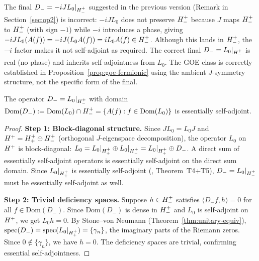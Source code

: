 \begin{remark}
\label{rem:final-correction}
The final $D_{-} = -iJ L_0|_{H^+_-}$ suggested in
the previous version (Remark in Section~\ref{sec:op2}) is incorrect:
$-iJL_0$ does not preserve $H^+_-$ because $J$ maps
$H^+_-$ to $H^+_-$ (with sign $-1$) while $-i$ introduces
a phase, giving $-iJL_0(A(f)) = -iJ(L_0 A(f)) = iL_0 A(f)\in H^+_-$.
Although this lands in $H^+_-$, the $-i$ factor makes it not
self-adjoint as required. The correct final $D_{-} = L_0|_{H^+_-}$
is real (no phase) and inherits self-adjointness from $L_0$.
The GOE class is correctly established in
Proposition~\ref{prop:goe-fermionic} using the ambient $J$-symmetry
structure, not the specific form of the final.
\end{remark}

\begin{theorem}
\label{thm:op2-selfadj}
The operator $D_{-} = L_0|_{H^+_-}$ with domain
$\mathrm{Dom}(D_{-}) := \mathrm{Dom}(L_0)\cap H^+_-
= \{A(f) : f\in\mathrm{Dom}(L_0)\}$
is essentially self-adjoint.
\end{theorem}

\begin{proof}
\textbf{Step 1: Block-diagonal structure.}
Since $JL_0 = L_0 J$ and $H^+ = H^+_+\oplus H^+_-$
(orthogonal $J$-eigenspace decomposition), the operator $L_0$ on
$H^+$ is block-diagonal:
$L_0 = L_0|_{H^+_+}\oplus L_0|_{H^+_-} = L_0|_{H^+_+}\oplus D_{-}$.
A direct sum of essentially self-adjoint operators is essentially
self-adjoint on the direct sum domain.
Since $L_0|_{H^+_+}$ is essentially self-adjoint
(\cite{brendecke2026rh}, Theorem~T4+T5), $D_{-} = L_0|_{H^+_-}$
must be essentially self-adjoint as well.

\textbf{Step 2: Trivial deficiency spaces.}
Suppose $h\in H^+_-$ satisfies $\langle D_{-}f,h\rangle = 0$
for all $f\in\mathrm{Dom}(D_{-})$.
Since $\mathrm{Dom}(D_{-})$ is dense in $H^+_-$
and $L_0$ is self-adjoint on $H^+$, we get $L_0 h = 0$.
By Stone--von Neumann (Theorem~\ref{thm:unitary-equiv}),
$\mathrm{spec}(D_{-}) = \mathrm{spec}(L_0|_{H^+_+}) = \{\gamma_n\}$,
the imaginary parts of the Riemann zeros.
Since $0\notin\{\gamma_n\}$, we have $h=0$.
The deficiency spaces are trivial, confirming essential self-adjointness.
\end{proof}

